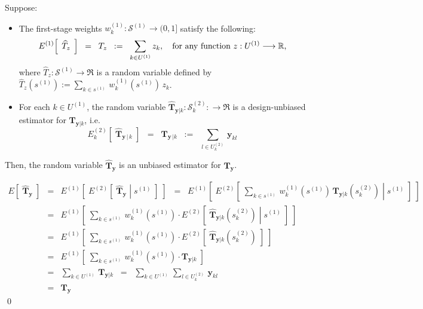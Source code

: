 \documentclass{article}
\begin{document}
\begin{proposition}
\quad
Suppose:
\begin{itemize}
\item	The first-stage weights $w^{(1)}_{k} : \mathcal{S}^{(1)} \longrightarrow (0,1]$
		satisfy the following:
		\begin{equation*}
		E^{(1)}\!\left[\;\,\widehat{T}_{z}\,\;\right] \;\; = \;\; T_{z} \;\;:=\;\; \sum_{k\in U^{(1)}}z_{k},
		\quad\textnormal{for any function $z : U^{(1)} \longrightarrow \Re$,}
		\end{equation*}
		where $\widehat{T}_{z} : \mathcal{S}^{(1)} \longrightarrow \Re$ is a random variable defined by
		$\widehat{T}_{z}(s^{(1)}) := \underset{k \in s^{(1)}}{\sum}\,w^{(1)}_{k}(s^{(1)})\,z_{k}$.
\item	For each $k \in U^{(1)}$, the random variable
		$\widehat{\mathbf{T}}_{\mathbf{y}\vert k} : \mathcal{S}^{(2)}_{k} : \longrightarrow \Re$
		is a design-unbiased
		estimator for $\mathbf{T}_{\mathbf{y}\vert k}$, i.e.
		\begin{equation*}
		E^{(2)}_{k}\!\left[\;\widehat{\mathbf{T}}_{\mathbf{y}\,\vert\,k}\;\right]
		\;\;=\;\; \mathbf{T}_{\mathbf{y}\,\vert k}
		\;\;:=\;\; \sum_{l \in U^{(2)}_{k}}\,\mathbf{y}_{kl}
		\end{equation*}
\end{itemize}
Then, the random variable $\widehat{\mathbf{T}}_{\mathbf{y}}$ is an unbiased estimator for $\mathbf{T}_{\mathbf{y}}$.
\end{proposition}

\proof
\begin{eqnarray*}
E\!\left[\;\widehat{\mathbf{T}}_{\mathbf{y}}\;\right]
&=& E^{(1)}\!\left[\;E^{(2)}\!\left[\;\left.\widehat{\mathbf{T}}_{\mathbf{y}}\;\right\vert\;s^{(1)}\;\right]\;\right]
\;\;=\;\; E^{(1)}\!\left[\;E^{(2)}\!\left[\;\left.
\sum_{k\in s^{(1)}}\,w^{(1)}_{k}(s^{(1)})\,\widehat{\mathbf{T}}_{\mathbf{y}\vert k}(s^{(2)}_{k})
\;\right\vert\;s^{(1)}\;\right]\;\right] \\
&=& E^{(1)}\!\left[\;
\sum_{k\in s^{(1)}}\,w^{(1)}_{k}(s^{(1)})
\cdot
E^{(2)}\!\left[\;\left.
\widehat{\mathbf{T}}_{\mathbf{y}\vert k}(s^{(2)}_{k})
\;\right\vert\;s^{(1)}\;\right]\;\right] \\
&=& E^{(1)}\!\left[\;
\sum_{k\in s^{(1)}}\,w^{(1)}_{k}(s^{(1)})
\cdot
E^{(2)}\!\left[\;\widehat{\mathbf{T}}_{\mathbf{y}\vert k}(s^{(2)}_{k})\;\right]
\;\right] \\
&=& E^{(1)}\!\left[\;
\sum_{k\in s^{(1)}}\,w^{(1)}_{k}(s^{(1)})
\cdot
\mathbf{T}_{\mathbf{y}\vert k}
\;\right] \\
&=&
\sum_{k\in U^{(1)}}\,\mathbf{T}_{\mathbf{y}\vert k}
\;\;=\;\;
\sum_{k\in U^{(1)}}\,\sum_{l \in U^{(2)}_{k}}\,\mathbf{y}_{kl}
\\
&=&
\mathbf{T}_{\mathbf{y}}
\end{eqnarray*}
\qed
\end{document}
